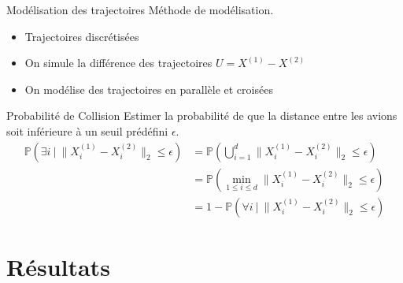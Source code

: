 \documentclass{beamer} %
\begin{document}
	\begin{frame}[t]{Modélisation des trajectoires}
		Méthode de modélisation.
		\begin{itemize}
			\item<+-> Trajectoires discrétisées
			\item<+-> On simule la différence des trajectoires $U=X^{(1)} - X^{(2)}$
			\item<+-> On modélise des trajectoires en parallèle et croisées
		\end{itemize}
	\end{frame}
	\begin{frame}[t]{Probabilité de Collision}
		Estimer la probabilité de que la distance entre les avions soit inférieure à un seuil prédéfini $\epsilon$.
		\begin{subequations}
		\begin{align*}
			\mathbb{P}\left(\exists i~|~ \lVert X^{(1)}_{i} - X^{(2)}_{i} \rVert_2 \leq \epsilon \right)
			&= \mathbb{P}\left(\bigcup_{i=1}^{d} \lVert X^{(1)}_{i} - X^{(2)}_{i} \rVert_2 \leq \epsilon  \right)  \\
			&= \mathbb{P}\left(\min_{1\leq i\leq d} \lVert X^{(1)}_{i} - X^{(2)}_{i} \rVert_2 \leq \epsilon \right)  \\
			&= 1-\mathbb{P}\left(\forall i~|~ \lVert X^{(1)}_{i} - X^{(2)}_{i} \rVert_2 \leq \epsilon \right) \label{eq:numerique}
		\end{align*}
		\end{subequations}
	\end{frame}
	
	\section{Résultats} %
	\label{sec:resultats}
	
\end{document}
